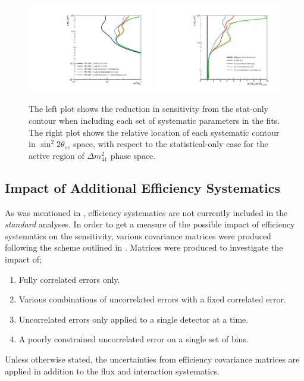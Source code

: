 \begin{figure}[h!]
    \centering
    \includegraphics[width = 0.49\textwidth]{figures-chap6/exclusion_contours/nue_disapp_syst_groups.pdf}
    \includegraphics[width = 0.49\textwidth]{figures-chap6/exclusion_contours/nue_disapp_syst_groups_ratios.pdf}
    \caption[\nue app sensitivity reduction from different systematic groups.]{The left plot shows the reduction in sensitivity from the stat-only contour when including each set of systematic parameters in the fits. The right plot shows the relative location of each systematic contour in $\sin^{2}2\theta_{ee}$ space, with respect to the statistical-only case for the active region of $\Delta m_{41}^{2}$ phase space.}
    \label{fig:nue_disapp_syst_groups}
\end{figure}


\subsection{Impact of Additional Efficiency Systematics}\label{Impact of Additional Efficiency Systematics}

As was mentioned in , efficiency systematics are not currently included in the \textit{standard} analyses. In order to get a measure of the possible impact of efficiency systematics on the sensitivity, various covariance matrices were produced following the scheme outlined in . Matrices were produced to investigate the impact of;
\begin{enumerate}
    \item Fully correlated errors only.
    \item Various combinations of uncorrelated errors with a fixed correlated error.
    \item Uncorrelated errors only applied to a single detector at a time.
    \item A poorly constrained uncorrelated error on a single set of bins.
\end{enumerate}
Unless otherwise stated, the uncertainties from efficiency covariance matrices are applied in addition to the flux and interaction systematics. 

